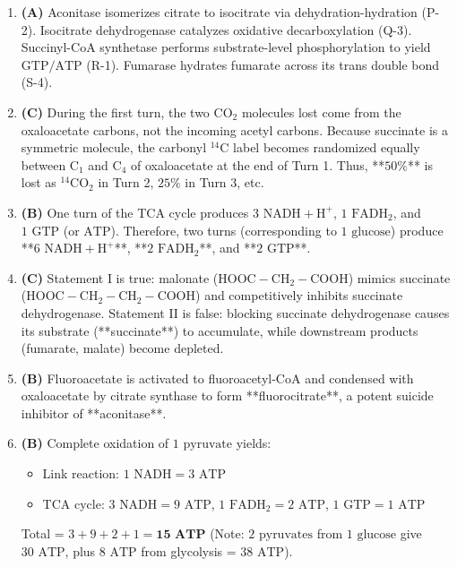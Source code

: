 \documentclass[11pt, a4paper]{article}
\begin{document}
\begin{enumerate}[label=\textbf{\arabic*.}]
\item \textbf{(A)} Aconitase isomerizes citrate to isocitrate via dehydration-hydration (P-2). Isocitrate dehydrogenase catalyzes oxidative decarboxylation (Q-3). Succinyl-CoA synthetase performs substrate-level phosphorylation to yield $\text{GTP}/\text{ATP}$ (R-1). Fumarase hydrates fumarate across its trans double bond (S-4).

\item \textbf{(C)} During the first turn, the two $\text{CO}_2$ molecules lost come from the oxaloacetate carbons, not the incoming acetyl carbons. Because succinate is a symmetric molecule, the carbonyl $^{14}\text{C}$ label becomes randomized equally between $\text{C}_1$ and $\text{C}_4$ of oxaloacetate at the end of Turn 1. Thus, **$50\%$** is lost as $^{14}\text{CO}_2$ in Turn 2, $25\%$ in Turn 3, etc.

\item \textbf{(B)} One turn of the TCA cycle produces $3\text{ NADH} + \text{H}^+$, $1\text{ FADH}_2$, and $1\text{ GTP}$ (or $\text{ATP}$). Therefore, two turns (corresponding to $1\text{ glucose}$) produce **$6\text{ NADH} + \text{H}^+$**, **$2\text{ FADH}_2$**, and **$2\text{ GTP}$**.

\item \textbf{(C)} Statement I is true: malonate ($\text{HOOC}-\text{CH}_2-\text{COOH}$) mimics succinate ($\text{HOOC}-\text{CH}_2-\text{CH}_2-\text{COOH}$) and competitively inhibits succinate dehydrogenase. Statement II is false: blocking succinate dehydrogenase causes its substrate (**succinate**) to accumulate, while downstream products (fumarate, malate) become depleted.

\item \textbf{(B)} Fluoroacetate is activated to fluoroacetyl-CoA and condensed with oxaloacetate by citrate synthase to form **fluorocitrate**, a potent suicide inhibitor of **aconitase**.

\item \textbf{(B)} Complete oxidation of $1\text{ pyruvate}$ yields:
\begin{itemize}
    \item Link reaction: $1\text{ NADH} = 3\text{ ATP}$
    \item TCA cycle: $3\text{ NADH} = 9\text{ ATP}$, $1\text{ FADH}_2 = 2\text{ ATP}$, $1\text{ GTP} = 1\text{ ATP}$
\end{itemize}
Total = $3 + 9 + 2 + 1 = \mathbf{15\text{ ATP}}$ (Note: $2\text{ pyruvates}$ from $1\text{ glucose}$ give $30\text{ ATP}$, plus $8\text{ ATP}$ from glycolysis = $38\text{ ATP}$).


\end{enumerate}
\end{document}
